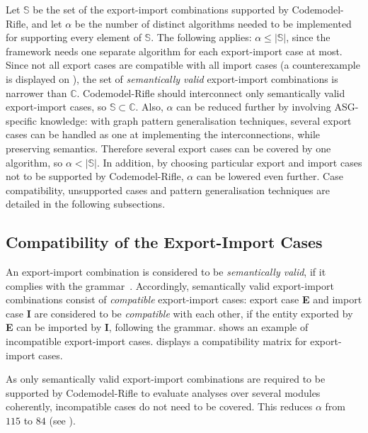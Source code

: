 Let $\mathbb{S}$ be the set of the export-import combinations supported by Codemodel-Rifle, and let $\alpha$ be the number of distinct algorithms needed to be implemented for supporting every element of $\mathbb{S}$. The following applies: $\alpha \leq |\mathbb{S}|$, since the framework needs one separate algorithm for each export-import case at most. Since not all export cases are compatible with all import cases (a counterexample is displayed on ), the set of \emph{semantically valid} export-import combinations is narrower than $\mathbb{C}$. Codemodel-Rifle should interconnect only semantically valid export-import cases, so $\mathbb{S} \subset \mathbb{C}$. Also, $\alpha$ can be reduced further by involving ASG-specific knowledge: with graph pattern generalisation techniques, several export cases can be handled as one at implementing the interconnections, while preserving semantics. Therefore several export cases can be covered by one algorithm, so $\alpha < |\mathbb{S}|$. In addition, by choosing particular export and import cases not to be supported by Codemodel-Rifle, $\alpha$ can be lowered even further. Case compatibility, unsupported cases and pattern generalisation techniques are detailed in the following subsections.


\subsection{Compatibility of the Export-Import Cases}

An export-import combination is considered to be \emph{semantically valid}, if it complies with the \es grammar~\cite{export-grammar, import-grammar}. Accordingly, semantically valid export-import combinations consist of \emph{compatible} export-import cases: export case \textbf{E} and import case \textbf{I} are considered to be \emph{compatible} with each other, if the entity exported by \textbf{E} can be imported by \textbf{I}, following the \es grammar.  shows an example of incompatible export-import cases.  displays a compatibility matrix for \es export-import cases.

As only semantically valid export-import combinations are required to be supported by Codemodel-Rifle to evaluate analyses over several \es modules coherently, incompatible cases do not need to be covered. This reduces $\alpha$ from $115$ to $84$ (see ).


